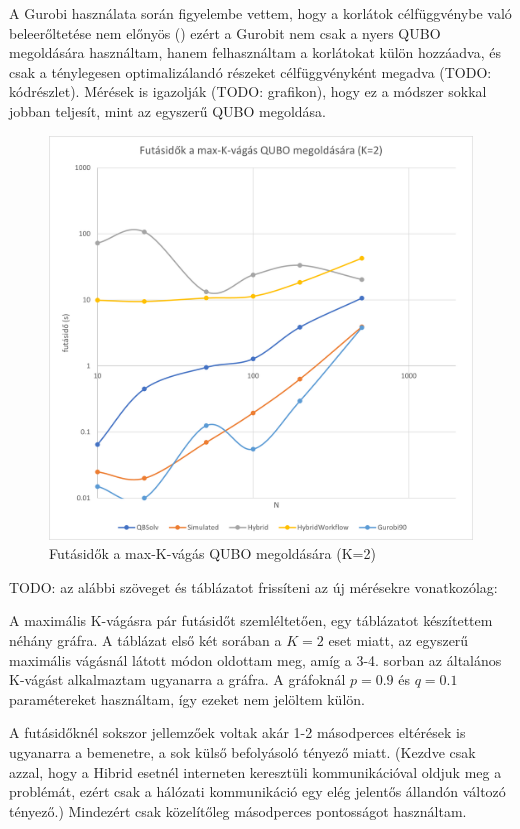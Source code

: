 A Gurobi használata során figyelembe vettem, hogy a korlátok célfüggvénybe való beleerőltetése nem előnyös () ezért a Gurobit nem csak a nyers QUBO megoldására használtam, hanem felhasználtam a korlátokat külön hozzáadva, és csak a ténylegesen optimalizálandó részeket célfüggvényként megadva (TODO: kódrészlet). Mérések is igazolják (TODO: grafikon), hogy ez a módszer sokkal jobban teljesít, mint az egyszerű QUBO megoldása.

\begin{figure}[!ht]
	\centering
	\includegraphics[width=150mm, keepaspectratio]{figures/diagrams/maxKCutQUBO_K2.png}
	\caption{Futásidők a max-K-vágás QUBO megoldására (K=2)}
	\label{fig:maxKCutQUBO_K2}
\end{figure}

TODO: az alábbi szöveget és táblázatot 
frissíteni az új mérésekre vonatkozólag:

A maximális K-vágásra pár futásidőt szemléltetően, egy táblázatot készítettem néhány gráfra. A táblázat első két sorában a $K=2$ eset miatt, az egyszerű maximális vágásnál látott módon oldottam meg, amíg a 3-4. sorban az általános K-vágást alkalmaztam ugyanarra a gráfra. A gráfoknál $p=0.9$ és $q=0.1$ paramétereket használtam, így ezeket nem jelöltem külön.

A futásidőknél sokszor jellemzőek voltak akár 1-2 másodperces eltérések is ugyanarra a bemenetre, a sok külső befolyásoló tényező miatt. (Kezdve csak azzal, hogy a Hibrid esetnél interneten keresztüli kommunikációval oldjuk meg a problémát, ezért csak a hálózati kommunikáció egy elég jelentős állandón változó tényező.) Mindezért csak közelítőleg másodperces pontosságot használtam.

